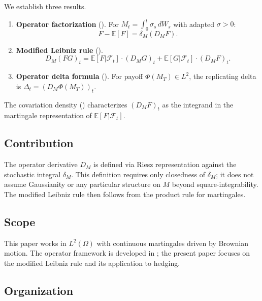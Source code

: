 \documentclass[11pt]{article}
\theoremstyle{plain}
\theoremstyle{definition}
\theoremstyle{remark}
\newcommand{\E}{\mathbb{E}}
\newcommand{\F}{\mathcal{F}}
\begin{document}
We establish three results.

\begin{enumerate}[label=(\roman*)]
\item \textbf{Operator factorization} (). 
For $M_t = \int_0^t \sigma_s\,dW_s$ with adapted $\sigma > 0$:
\begin{equation}\label{eq:factorization-intro}
F - \E[F] = \delta_M(D_M F).
\end{equation}

\item \textbf{Modified Leibniz rule} (). 
\begin{equation}\label{eq:leibniz-intro}
D_M(FG)_t = \E[F|\F_t] \cdot (D_M G)_t + \E[G|\F_t] \cdot (D_M F)_t.
\end{equation}

\item \textbf{Operator delta formula} (). 
For payoff $\Phi(M_T) \in L^2$, the replicating delta is $\Delta_t = (D_M \Phi(M_T))_t$.
\end{enumerate}

The covariation density () characterizes $(D_M F)_t$ as 
the integrand in the martingale representation of $\E[F|\F_t]$.

\subsection{Contribution}

The operator derivative $D_M$ is defined via Riesz representation against the 
stochastic integral $\delta_M$. This definition requires only closedness of 
$\delta_M$; it does not assume Gaussianity or any particular structure on $M$ 
beyond square-integrability. The modified Leibniz rule then follows from the 
product rule for martingales.

\subsection{Scope}

This paper works in $L^2(\Omega)$ with continuous martingales driven by 
Brownian motion. The operator framework is developed in 
\cite{Fontes2026a, Fontes2026d}; the present paper 
focuses on the modified Leibniz rule and its application to hedging.

\subsection{Organization}
\end{document}
